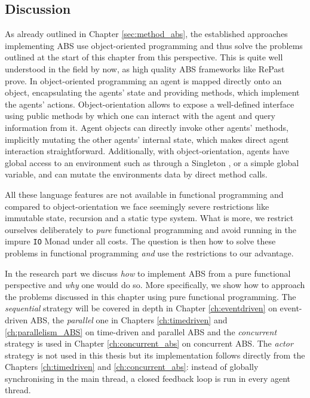 \subsection{Discussion}
As already outlined in Chapter \ref{sec:method_abs}, the established approaches implementing ABS use object-oriented programming and thus solve the problems outlined at the start of this chapter from this perspective. This is quite well understood  in the field by now, as high quality ABS frameworks like RePast \cite{north_complex_2013} prove. In object-oriented programming an agent is mapped directly onto an object, encapsulating the agents' state and providing methods, which implement the agents' actions. Object-orientation allows to expose a well-defined interface using public methods by which one can interact with the agent and query information from it. Agent objects can directly invoke other agents' methods, implicitly mutating the other agents' internal state, which makes direct agent interaction straightforward. Additionally, with object-orientation, agents have global access to an environment such as through a Singleton \cite{gamma_design_1994}, or a simple global variable, and can mutate the environments data by direct method calls.

All these language features are not available in functional programming and compared to object-orientation we face seemingly severe restrictions like immutable state, recursion and a static type system. What is more, we restrict ourselves deliberately to \textit{pure} functional programming and avoid running in the impure \texttt{IO} Monad under all costs. The question is then how to solve these problems in functional programming \textit{and} use the restrictions to our advantage.

In the research part we discuss \textit{how} to implement ABS from a pure functional perspective and \textit{why} one would do so. More specifically, we show how to approach the problems discussed in this chapter using pure functional programming. The \textit{sequential} strategy will be covered in depth in Chapter \ref{ch:eventdriven} on event-driven ABS, the \textit{parallel} one in Chapters \ref{ch:timedriven} and \ref{ch:parallelism_ABS} on time-driven and parallel ABS and the \textit{concurrent} strategy is used in Chapter \ref{ch:concurrent_abs} on concurrent ABS. The \textit{actor} strategy is not used in this thesis but its implementation follows directly from the Chapters \ref{ch:timedriven} and \ref{ch:concurrent_abs}: instead of globally synchronising in the main thread, a closed feedback loop is run in every agent thread.
